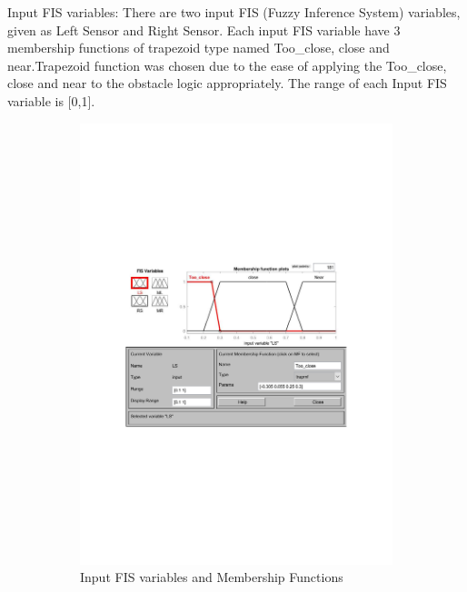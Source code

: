\documentclass{l4proj}
\begin{document}
Input FIS variables:  There are two input FIS (Fuzzy Inference System) variables, given as Left Sensor and Right Sensor. Each input FIS variable have 3 membership functions of trapezoid type named Too\_close, close and near.Trapezoid function was chosen due to the ease of applying the Too\_close, close and near to the obstacle  logic appropriately. The range of each Input FIS variable is [0,1].
\begin{figure}[htb]
    \centering
    \begin{subfigure}{0.45\textwidth}
        \includegraphics[width=\textwidth]{images/input functions.pdf}
        \caption{Input FIS variables and Membership Functions}
        \label{fig:syn1}
    \end{subfigure}
    \begin{subfigure}{0.45\textwidth}

\end{subfigure}
\end{figure}
\end{document}
